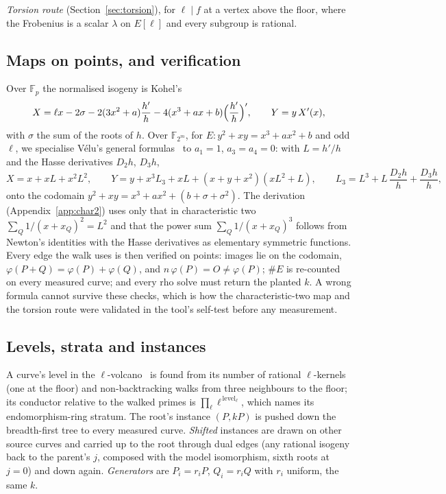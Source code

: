 \documentclass[10pt,a4paper]{article}
\theoremstyle{remark}
\newcommand{\FF}{\mathbb{F}}
\begin{document}
\emph{Torsion route} (Section~\ref{sec:torsion}), for $\ell \mid f$ at a vertex
above the floor, where the Frobenius is a scalar $\lambda$ on $E[\ell]$ and
every subgroup is rational.

\subsection{Maps on points, and verification}
Over $\FF_p$ the normalised isogeny is Kohel's~\cite{Kohel1996}
\[
X = \ell x - 2\sigma - 2(3x^2 + a)\frac{h'}{h} - 4(x^3 + ax + b)\Bigl(\frac{h'}{h}\Bigr)', \qquad Y = y\,X'(x),
\]
with $\sigma$ the sum of the roots of $h$. Over $\FF_{2^m}$, for
$E\colon y^2 + xy = x^3 + ax^2 + b$ and odd $\ell$, we specialise V\'elu's
general formulas~\cite{Velu1971,Washington2008} to $a_1 = 1$, $a_3 = a_4 = 0$:
with $L = h'/h$ and the Hasse derivatives $D_2 h$, $D_3 h$,
\begin{equation}\label{eq:char2}
X = x + xL + x^2 L^2, \qquad
Y = y + x^3 L_3 + xL + (x + y + x^2)(xL^2 + L), \qquad
L_3 = L^3 + L\,\frac{D_2 h}{h} + \frac{D_3 h}{h},
\end{equation}
onto the codomain $y^2 + xy = x^3 + ax^2 + (b + \sigma + \sigma^2)$. The
derivation (Appendix~\ref{app:char2}) uses only that in characteristic two
$\sum_Q 1/(x + x_Q)^2 = L^2$ and that the power sum $\sum_Q 1/(x + x_Q)^3$
follows from Newton's identities with the Hasse derivatives as elementary
symmetric functions. Every edge the walk uses is then verified on points:
images lie on the codomain, $\varphi(P + Q) = \varphi(P) + \varphi(Q)$, and
$n\,\varphi(P) = O \ne \varphi(P)$; $\#E$ is re-counted on every measured
curve; and every rho solve must return the planted $k$. A wrong formula
cannot survive these checks, which is how the characteristic-two map and the
torsion route were validated in the tool's self-test before any measurement.

\subsection{Levels, strata and instances}
A curve's level in the $\ell$-volcano~\cite{FouquetMorain2002} is found from
its number of rational $\ell$-kernels (one at the floor) and
non-backtracking walks from three neighbours to the floor; its conductor
relative to the walked primes is $\prod_\ell \ell^{\,\mathrm{level}_\ell}$,
which names its endomorphism-ring stratum. The root's instance $(P, kP)$ is
pushed down the breadth-first tree to every measured curve. \emph{Shifted}
instances are drawn on other source curves and carried up to the root through
dual edges (any rational isogeny back to the parent's $j$, composed with the
model isomorphism, sixth roots at $j = 0$) and down again. \emph{Generators}
are $P_i = r_i P$, $Q_i = r_i Q$ with $r_i$ uniform, the same $k$.
\end{document}
